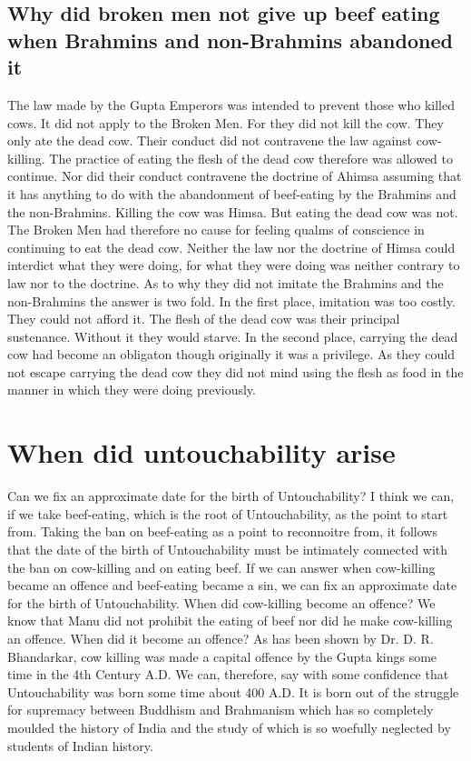 \documentclass{article}
\begin{document}
\subsection{Why did broken men not give up beef eating when Brahmins and non-Brahmins abandoned it}
\begin{shadequote}
The law made by the Gupta Emperors was intended to prevent those who killed cows. It did not apply to the Broken Men. For they did not kill the cow. They only ate the dead cow. Their conduct did not contravene the law against cow-killing. The practice of eating the flesh of the dead cow therefore was allowed to continue. Nor did their conduct contravene the doctrine of Ahimsa assuming that it has anything to do with the abandonment of beef-eating by the Brahmins and the non-Brahmins. Killing the cow was Himsa. But eating the dead cow was not. The Broken Men had therefore no cause for feeling qualms of conscience in continuing to eat the dead cow. Neither the law nor the doctrine of Himsa could interdict what they were doing, for what they were doing was neither contrary to law nor to the doctrine.
As to why they did not imitate the Brahmins and the non-Brahmins the answer is two fold. In the first place, imitation was too costly. They could not afford it. The flesh of the dead cow was their principal sustenance. Without it they would starve. In the second place, carrying the dead cow had become an obligaton though originally it was a privilege. As they could not escape carrying the dead cow they did not mind using the flesh as food in the manner in which they were doing previously.
\end{shadequote}

\section{When did untouchability arise}
\begin{shadequote}
Can we fix an approximate date for the birth of Untouchability? I think we can, if we take beef-eating, which is the root of Untouchability, as the point to start from. Taking the ban on beef-eating as a point to reconnoitre from, it follows that the date of the birth of Untouchability must be intimately connected with the ban on cow-killing and on eating beef. If we can answer when cow-killing became an offence and beef-eating became a sin, we can fix an approximate date for the birth of Untouchability. When did cow-killing become an offence? We know that Manu did not prohibit the eating of beef nor did he make cow-killing an offence. When did it become an offence? As has been shown by Dr. D. R. Bhandarkar, cow killing was made a capital offence by the Gupta kings some time in the 4th Century A.D.
We can, therefore, say with some confidence that Untouchability was born some time about 400 A.D. It is born out of the struggle for supremacy between Buddhism and Brahmanism which has so completely moulded the history of India and the study of which is so woefully neglected by students of Indian history.
\end{shadequote}
\end{document}
